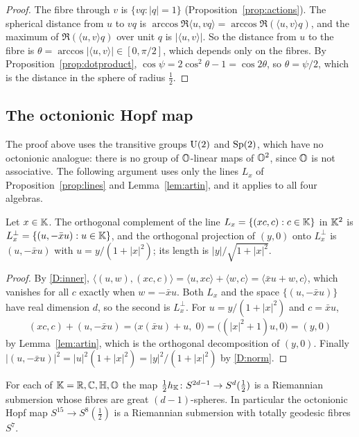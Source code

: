 \begin{proof}
The fibre through $v$ is $\{vq:|q|=1\}$ (Proposition~\ref{prop:actions}). The spherical distance from $u$ to $vq$ is $\arccos\Re\langle u,vq\rangle=\arccos\Re(\langle u,v\rangle q)$, and the maximum of $\Re(\langle u,v\rangle q)$ over unit $q$ is $|\langle u,v\rangle|$. So the distance from $u$ to the fibre is $\theta=\arccos|\langle u,v\rangle|\in[0,\pi/2]$, which depends only on the fibres. By Proposition~\ref{prop:dotproduct}, $\cos\psi=2\cos^2\theta-1=\cos2\theta$, so $\theta=\psi/2$, which is the distance in the sphere of radius $\frac12$.
\end{proof}

\subsection{The octonionic Hopf map}\label{sec:octsubmersion}

The proof above uses the transitive groups $\mathrm{U}(2)$ and $\mathrm{Sp}(2)$, which have no octonionic analogue: there is no group of $\mathbb{O}$-linear maps of $\mathbb{O}^2$, since $\mathbb{O}$ is not associative. The following argument uses only the lines $L_x$ of Proposition~\ref{prop:lines} and Lemma~\ref{lem:artin}, and it applies to all four algebras.

\begin{lemma}\label{lem:lineperp}
Let $x\in\mathbb{K}$. The orthogonal complement of the line $L_x=\{(xc,c):c\in\mathbb{K}\}$ in $\mathbb{K}^2$ is $L_x^\perp=\{(u,-\bar xu):u\in\mathbb{K}\}$, and the orthogonal projection of $(y,0)$ onto $L_x^\perp$ is $(u,-\bar xu)$ with $u=y/(1+|x|^2)$; its length is $|y|/\sqrt{1+|x|^2}$.
\end{lemma}

\begin{proof}
By \ref{D:inner}, $\langle(u,w),(xc,c)\rangle=\langle u,xc\rangle+\langle w,c\rangle=\langle\bar xu+w,c\rangle$, which vanishes for all $c$ exactly when $w=-\bar xu$. Both $L_x$ and the space $\{(u,-\bar xu)\}$ have real dimension $d$, so the second is $L_x^\perp$. For $u=y/(1+|x|^2)$ and $c=\bar xu$,
\[
(xc,c)+(u,-\bar xu)=\bigl(x(\bar xu)+u,\;0\bigr)=\bigl((|x|^2+1)u,0\bigr)=(y,0)
\]
by Lemma~\ref{lem:artin}, which is the orthogonal decomposition of $(y,0)$. Finally $|(u,-\bar xu)|^2=|u|^2(1+|x|^2)=|y|^2/(1+|x|^2)$ by \ref{D:norm}.
\end{proof}

\begin{proposition}\label{prop:octsubmersion}
For each of $\mathbb{K}=\mathbb{R},\mathbb{C},\mathbb{H},\mathbb{O}$ the map $\tfrac12h_{\mathbb{K}}\colon S^{2d-1}\to S^d(\tfrac12)$ is a Riemannian submersion whose fibres are great $(d-1)$-spheres. In particular the octonionic Hopf map $S^{15}\to S^8(\tfrac12)$ is a Riemannian submersion with totally geodesic fibres $S^7$.
\end{proposition}

